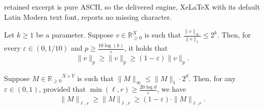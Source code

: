 \documentclass[10pt,a4paper]{amsart}
\newcommand{\R}{\mathbb{R}}
\newcommand{\eps}{\varepsilon}
\begin{document}
retained excerpt is pure ASCII, so the delivered engine, XeLaTeX with its default Latin Modern text font, reports no missing character.
\begin{prop}\label{prop:vector norm vs flat norm}
    Let $k\ge 1$ be a parameter. Suppose $v\in \mathbb{R}_{\ge 0}^{X}$ is such that $\frac{\|v\|_{\infty}}{\|v\|_{1}}\le 2^k$. Then, for every $\eps \in (0, 1/10)$ and $p\ge \frac{10 \log(k)}{\eps}$, it holds that
    \begin{align}
        \|v\|_{p} \ge \| v \|_{\overline{p}} \ge (1-\eps) \| v \|_p.
    \end{align}
\end{prop}

\begin{lemma}\label{lemma:flat-to-operator-norm}
Suppose $M\in {\R_{\ge 0}}^{X\times Y}$ is such that $\|M\|_{\infty} \le \|M\|_1 \cdot 2^d$. Then, for any $\eps\in (0, 1)$, provided that $\min(\ell, r)\ge \frac{20 \log d}{\eps}$, we have
\begin{align}
\|M\|_{\ell, r} \ge \|M\|_{\overline{\ell},\overline{r}} \ge (1-\eps)\cdot \| M \|_{\ell, r}. \label{equ:matrix flat vs operator norm} 
\end{align}
\end{lemma}
\end{document}
